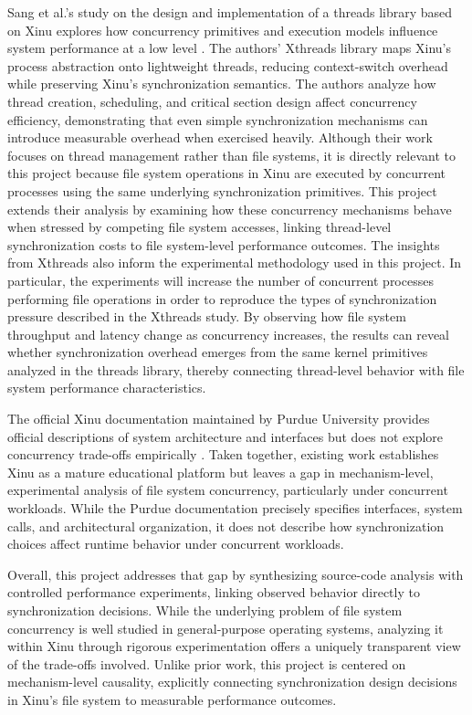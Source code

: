 \documentclass[sigconf]{acmart}
\begin{document}
Sang et al.'s study on the design and implementation of a threads library based on Xinu explores how concurrency primitives and execution models influence system performance at a low level \cite{Sang1993DesignAI}. The authors' Xthreads library maps Xinu’s process abstraction onto lightweight threads, reducing context-switch overhead while preserving Xinu’s synchronization semantics. The authors analyze how thread creation, scheduling, and critical section design affect concurrency efficiency, demonstrating that even simple synchronization mechanisms can introduce measurable overhead when exercised heavily. Although their work focuses on thread management rather than file systems, it is directly relevant to this project because file system operations in Xinu are executed by concurrent processes using the same underlying synchronization primitives. This project extends their analysis by examining how these concurrency mechanisms behave when stressed by competing file system accesses, linking thread-level synchronization costs to file system-level performance outcomes. The insights from Xthreads also inform the experimental methodology used in this project. In particular, the experiments will increase the number of concurrent processes performing file operations in order to reproduce the types of synchronization pressure described in the Xthreads study. By observing how file system throughput and latency change as concurrency increases, the results can reveal whether synchronization overhead emerges from the same kernel primitives analyzed in the threads library, thereby connecting thread-level behavior with file system performance characteristics.

The official Xinu documentation maintained by Purdue University provides official descriptions of system architecture and interfaces but does not explore concurrency trade-offs empirically \cite{xinu_purdue2026}. Taken together, existing work establishes Xinu as a mature educational platform but leaves a gap in mechanism-level, experimental analysis of file system concurrency, particularly under concurrent workloads. While the Purdue documentation precisely specifies interfaces, system calls, and architectural organization, it does not describe how synchronization choices affect runtime behavior under concurrent workloads. 

Overall, this project addresses that gap by synthesizing source-code analysis with controlled performance experiments, linking observed behavior directly to synchronization decisions. While the underlying problem of file system concurrency is well studied in general-purpose operating systems, analyzing it within Xinu through rigorous experimentation offers a uniquely transparent view of the trade-offs involved. Unlike prior work, this project is centered on mechanism-level causality, explicitly connecting synchronization design decisions in Xinu’s file system to measurable performance outcomes.
\end{document}
